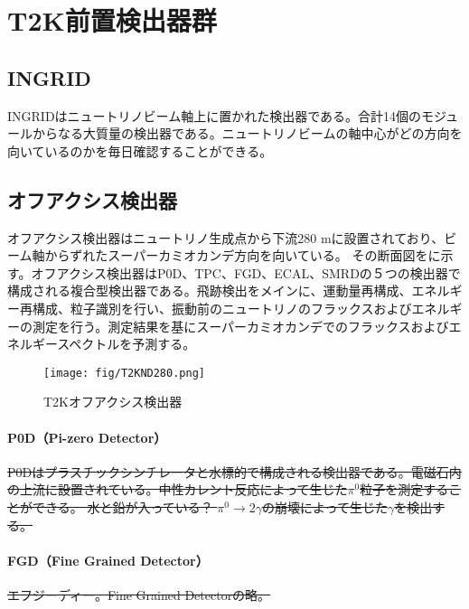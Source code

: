 \fi %

\section{T2K前置検出器群}
\subsection{INGRID}
INGRIDはニュートリノビーム軸上に置かれた検出器である。合計14個のモジュールからなる大質量の検出器である。ニュートリノビームの軸中心がどの方向を向いているのかを毎日確認することができる。


\subsection{オフアクシス検出器}
オフアクシス検出器はニュートリノ生成点から下流280 mに設置されており、ビーム軸からずれたスーパーカミオカンデ方向を向いている。
その断面図をに示す。オフアクシス検出器はP0D、TPC、FGD、ECAL、SMRDの５つの検出器で構成される複合型検出器である。飛跡検出をメインに、運動量再構成、エネルギー再構成、粒子識別を行い、振動前のニュートリノのフラックスおよびエネルギーの測定を行う。測定結果を基にスーパーカミオカンデでのフラックスおよびエネルギースペクトルを予測する。

\begin{figure}[htbp]
\centering
\texttt{[image: fig/T2KND280.png]}
\caption[T2Kオフアクシス検出器]{T2Kオフアクシス検出器}
\label{TOAD}
\end{figure}

\paragraph{P0D（Pi-zero Detector）}
\sout{P0Dはプラスチックシンチレータと水標的で構成される検出器である。電磁石内の上流に設置されている。中性カレント反応によって生じた$\pi^{0}$粒子を測定することができる。
水と鉛が入っている？
%
$\pi^{0} \rightarrow 2 \gamma$の崩壊によって生じた$\gamma$を検出する。}

\paragraph{FGD（Fine Grained Detector）}
\sout{エフジーディー。Fine Grained Detectorの略。}

